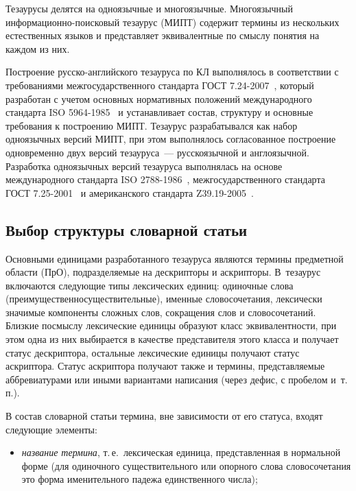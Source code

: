 \begin{multicols}{2}
  Тезаурусы делятся на одноязычные и многоязычные. Многоязычный 
  ин\-фор\-ма\-ци\-он\-но-по\-иско\-вый тезаурус (МИПТ) содержит термины из нескольких естественных языков и 
представляет эквивалентные по смыслу понятия на каждом из них. 

\columnbreak
  
  Построение русско-английского тезауруса по КЛ выполнялось в соответствии с 
требованиями межгосударственного стандарта ГОСТ 7.24-2007~\cite{11-zag}, который 
разработан с учетом основных нормативных положений международного стандарта ISO 
5964-1985~\cite{12-zag} и устанавливает состав, структуру и основные требования к 
построению МИПТ. Тезаурус разрабатывался как набор одноязычных версий МИПТ, при 
этом выполнялось согласованное построение одновременно двух версий тезауруса~--- 
русскоязычной и англоязычной. Разработка одноязычных версий тезауруса выполнялась на 
основе международного стандарта ISO 2788-1986~\cite{13-zag}, межгосударственного 
стандарта ГОСТ 7.25-2001~\cite{14-zag} и американского стандарта 
  Z39.19-2005~\cite{15-zag}.

\subsection{Выбор структуры словарной статьи}

  Основными единицами разработанного тезауруса являются термины предметной области 
(ПрО), подразделяемые на дескрипторы и аскрипторы. В~тезаурус включаются следующие 
типы лексических единиц: одиночные слова (преимущественно\linebreak существительные), именные 
словосочетания, лексически значимые компоненты сложных слов, сокращения слов и 
словосочетаний. Близкие по\linebreak смыслу лексические единицы образуют класс эквивалентности, 
при этом одна из них выбирается в качестве представителя этого класса и получает статус 
дескриптора, остальные лексические единицы получают статус аскриптора. Статус 
аскриптора получают также и термины, представляемые аббревиатурами или иными 
вариантами написания (через дефис, с пробелом и~т.\,п.).
  
  В состав словарной статьи термина, вне зависимости от его статуса, входят следующие 
элементы:
\begin{itemize}
\item  \textit{название термина}, т.\,е.\ лексическая единица, представленная в нормальной 
форме (для одиночного существительного или опорного слова словосочетания это форма 
именительного падежа единственного числа);
  

\end{itemize}
\end{multicols}
